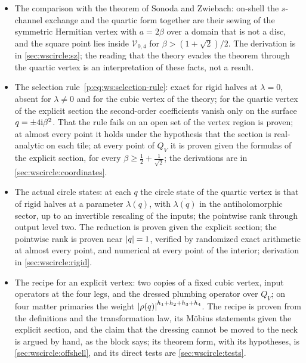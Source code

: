\begin{itemize}
  \item The comparison with the theorem of Sonoda and Zwiebach: on-shell the $s$-channel exchange and the quartic form together are their sewing of the symmetric Hermitian vertex with $a = 2 \beta$ over a domain that is not a disc, and the square point lies inside $\mathcal V_{0,4}$ for $\beta > (1 + \sqrt 2) / 2$.
    The derivation is in \cref{sec:wscircle:sz}; the reading that the theory evades the theorem through the quartic vertex is an interpretation of these facts, not a result.

  \item The selection rule~\eqref{p:eq:ws:selection-rule}: exact for rigid halves at $\lambda = 0$, absent for $\lambda \neq 0$ and for the cubic vertex of the theory; for the quartic vertex of the explicit section the second-order coefficients vanish only on the surface $q = \pm 4 \mathrm{i} \beta^2$.
    That the rule fails on an open set of the vertex region is proven; at almost every point it holds under the hypothesis that the section is real-analytic on each tile; at every point of $Q_V$ it is proven given the formulas of the explicit section, for every $\beta \geq \tfrac{1}{2} + \tfrac{1}{\sqrt 2}$; the derivations are in \cref{sec:wscircle:coordinates}.

  \item The actual circle states: at each $q$ the circle state of the quartic vertex is that of rigid halves at a parameter $\lambda(q)$, with $\overline{\lambda(q)}$ in the antiholomorphic sector, up to an invertible rescaling of the inputs; the pointwise rank through output level two.
    The reduction is proven given the explicit section; the pointwise rank is proven near ${|q|} = 1$, verified by randomized exact arithmetic at almost every point, and numerical at every point of the interior; derivation in \cref{sec:wscircle:rigid}.

  \item The recipe for an explicit vertex: two copies of a fixed cubic vertex, input operators at the four legs, and the dressed plumbing operator over $Q_V$; on four matter primaries the weight ${|\rho(q)|}^{h_1 + h_2 + h_3 + h_4}$.
    The recipe is proven from the definitions and the transformation law, its Möbius statements given the explicit section, and the claim that the dressing cannot be moved to the neck is argued by hand, as the block says; its theorem form, with its hypotheses, is \cref{sec:wscircle:offshell}, and its direct tests are \cref{sec:wscircle:tests}.


\end{itemize}
